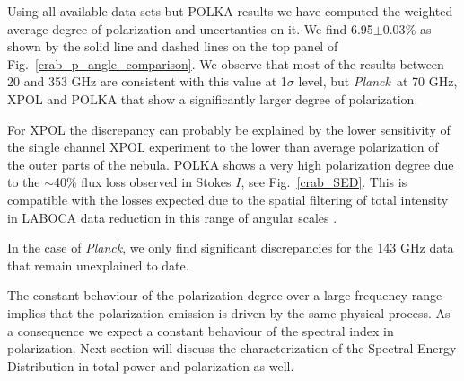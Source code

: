 \documentclass[twocolumn,traditabstract]{aa}
\def\NIKA{\textit{NIKA}}
\def\Planck{\textit{Planck}}
\def\WMAP{\textit{WMAP}}
\begin{document}
Using all available data sets but POLKA results we have computed the weighted average degree of polarization and uncertanties on it.
We find 6.95$\pm$0.03$\%$ as shown by the solid line and dashed lines on the top panel of Fig.~\ref{crab_p_angle_comparison}. We observe that most of the results between 20 and 353 GHz are consistent with this value at 1$\sigma$ level, but \Planck\ at 70 GHz, XPOL and POLKA that show a significantly larger degree of polarization.

For XPOL the discrepancy can
probably be explained by the lower sensitivity of the single channel XPOL
experiment to the lower than average polarization of the outer parts of the
nebula.
POLKA shows a very high polarization degree due to the $\sim$40\% flux loss observed in Stokes $I$, see Fig.~\ref{crab_SED}. This is compatible with the losses expected due to the spatial filtering of total intensity in LABOCA data reduction in this range of angular scales \citep{2011A&A...527A.145B}.

In the case of \Planck, we only find significant discrepancies for the 143 GHz data that remain unexplained to date.

The constant behaviour of the polarization degree over a large frequency range implies that the polarization emission is driven by the same physical process. As a consequence we expect a constant behaviour of the spectral index in polarization. Next section will discuss the characterization of the Spectral Energy Distribution in total power and polarization as well.




\end{document}
